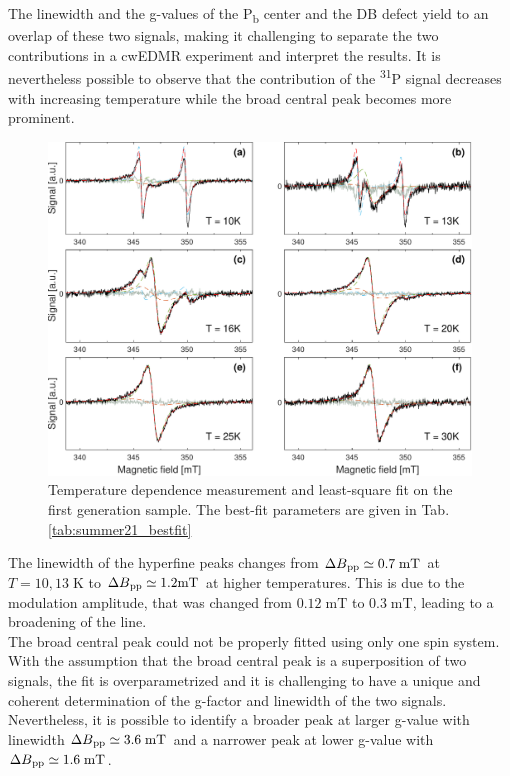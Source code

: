\documentclass[a4paper]{book}
\begin{document}
	\fi
	The linewidth and the g-values of the P\textsubscript{b} center and the DB defect yield to an overlap of these two signals, making it challenging to separate the two contributions in a cwEDMR experiment and interpret the results. It is nevertheless possible to observe that the contribution of the \textsuperscript{31}P signal decreases with increasing temperature while the broad central peak becomes more prominent.\\ 	\begin{figure}[t]
		\centering
		\includegraphics[width=\textwidth]{images/2021_summer_cw_T.pdf}
		\caption{Temperature dependence measurement and least-square fit on the first generation sample. The best-fit parameters are given in Tab. \ref{tab:summer21_bestfit}}
		\label{fig:2021_T_dep}
	\end{figure}
	The linewidth of the hyperfine peaks changes from $\Delta B\textsubscript{pp} \simeq 0.7 \; \text{mT}$ at $T = 10, 13 \; \text{K}$ to $\Delta B\textsubscript{pp} \simeq 1.2 \text{mT}$ at higher temperatures. This is due to the modulation amplitude, that was changed from $0.12 \; \text{mT}$ to $0.3 \; \text{mT}$, leading to a broadening of the line.\\
	The broad central peak could not be properly fitted using only one spin system. With the assumption that the broad central peak is a superposition of two signals, the fit is overparametrized and it is challenging to have a unique and coherent determination of the g-factor and linewidth of the two signals. Nevertheless, it is possible to identify a broader peak at larger g-value with linewidth $\Delta B\textsubscript{pp} \simeq 3.6 \; \text{mT}$ and a narrower peak at lower g-value with $\Delta B \textsubscript{pp} \simeq 1.6 \; \text{mT}$.\\
	\iffalse
	
\end{document}
